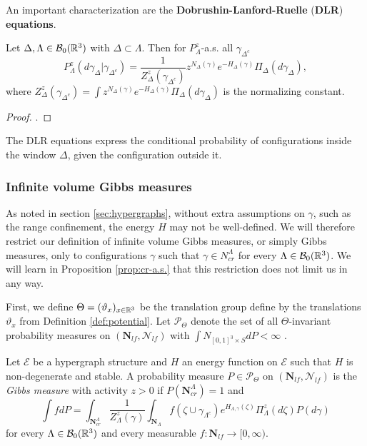An important characterization are the \textbf{Dobrushin-Lanford-Ruelle} (\textbf{DLR}) \textbf{equations}.

\begin{proposition}
	Let $\Delta,\Lambda\in \mathcal B_0({\mathbb R^3})$ with $\Delta \subset \Lambda$. Then for $P^z_{\Lambda}$-a.s. all $\gamma_{\Delta^c}$
	$$P^z_{\Lambda}(d\gamma_\Delta|\gamma_{\Delta^c}) = \frac 1{Z^z_\Delta(\gamma_{\Delta^c})} z^{N_\Delta(\gamma)} e^{-H_\Delta(\gamma)} \Pi_\Delta (d\gamma_\Delta),$$
		where $Z^z_{\Delta}(\gamma_{\Delta^c}) = \int z^{N_\Delta(\gamma)} e^{-H_\Delta(\gamma)} \Pi_\Delta(d\gamma_\Delta)$ is the normalizing constant. 
\end{proposition}
\begin{proof}.
\end{proof}

The DLR equations express the conditional probability of configurations inside the window $\Delta$, given the configuration outside it.



\subsubsection{Infinite volume Gibbs measures}
As noted in section \ref{sec:hypergraphs}, without extra assumptions on $\gamma$, such as the range confinement, the energy $H$ may not be well-defined. We will therefore restrict our definition of infinite volume Gibbs measures, or simply Gibbs measures, only to configurations $\gamma$ such that $\gamma \in N^\Lambda_{cr}$ for every $\Lambda \in \mathcal B_0({\mathbb R^3})$. We will learn in Proposition \ref{prop:cr-a.s.} that this restriction does not limit us in any way.

First, we define $\Theta=(\vartheta_x)_{x\in {\mathbb R^3}}$ be the translation group define by the translations $\vartheta_x$ from Definition \ref{def:potential}. Let $\mathcal P_\Theta$ denote the set of all $\Theta$-invariant probability measures on $(\mathbf N_{lf},\mathcal N_{lf})$ with $\int N_{[0,1]^3 \times S} dP< \infty $ . 

\begin{definition}
	Let $\mathcal E$ be a hypergraph structure and $H$ an energy function on $\mathcal E$ such that $H$ is non-degenerate and stable. A probability measure $P\in \mathcal P_\Theta$ on $(\mathbf N_{lf},\mathcal N_{lf})$ is the \textit{Gibbs measure} with activity $z>0$ if $P(\mathbf N^\Lambda_{cr})=1$ and
	$$\int f dP = \int_{\mathbf N^\Lambda_{cr}} \frac 1 {Z^z_{\Lambda}(\gamma)} \int_{\mathbf N_\Lambda} f(\zeta \cup \gamma_{\Lambda^c}) e^{H_{\Lambda,\gamma}(\zeta)} \Pi^z_\Lambda (d\zeta) P(d\gamma)$$
		for every $\Lambda \in \mathcal B_0({\mathbb R^3})$ and every measurable $f:\mathbf N_{lf} \to [0,\infty)$.
\end{definition}

